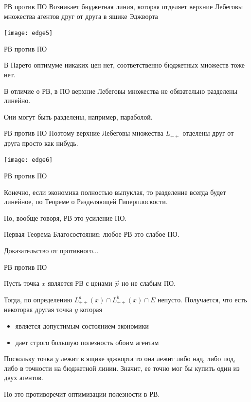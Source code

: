 \documentclass{beamer}
\begin{document}
\begin{frame}{РВ против ПО}
Возникает бюджетная линия, которая отделяет верхние Лебеговы множества агентов друг от друга в ящике Эджворта

\begin{center}
     \texttt{[image: edge5]}
     \end{center}

\end{frame}

\begin{frame}{РВ против ПО}

\alert{В Парето оптимуме никаких цен нет}, соответственно бюджетных множеств тоже нет. 

В отличие о РВ, в ПО верхние Лебеговы множества не обязательно разделены линейно. 

Они могут быть разделены, например, параболой.

\end{frame}

\begin{frame}{РВ против ПО}
Поэтому верхние Лебеговы множества $L_{++}$ отделены друг от друга просто как нибудь.

\begin{center}
     \texttt{[image: edge6]}
     \end{center}

\end{frame}

\begin{frame}{РВ против ПО}

Конечно, если экономика полностью выпуклая, то разделение всегда будет линейное, по Теореме о Разделяющей Гиперплоскости.

Но, вообще говоря, РВ это усиление ПО.

\alert{Первая Теорема Благосостояния}: любое РВ это слабое ПО.

Доказательство от противного...

\end{frame}

\begin{frame}{РВ против ПО}

Пусть точка $x$ является РВ с ценами $\vec p$ но не слабым ПО.

Тогда, по определению $L^a_{++}(x) \cap L_{++}^b(x) \cap E$ непусто. Получается, что есть некоторая другая точка $y$ которая
\begin{itemize}
  \item является допустимым состоянием экономики
  \item дает строго большую полезность обоим агентам
\end{itemize}
Поскольку точка $y$ лежит в ящике эджворта то она лежит либо над, либо под, либо в точности на бюджетной линии. Значит, ее точно мог бы купить один из двух агентов.

Но это противоречит оптимизации полезности в РВ.
\end{frame}
\end{document}
